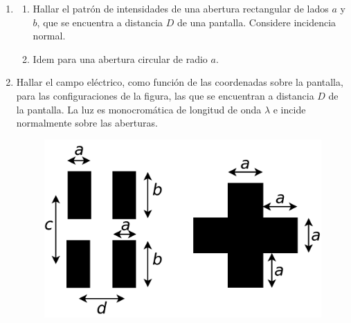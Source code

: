\documentclass[11pt,spanish,a4paper]{article}
\begin{document}
\begin{enumerate}
\item 
\begin{enumerate}
\item Hallar el patrón de intensidades de una abertura rectangular de lados
$a$ y $b$, que se encuentra a distancia $D$ de una pantalla. Considere
incidencia normal. 
\item Idem para una abertura circular de radio $a$.
\end{enumerate}
\item Hallar el campo eléctrico, como función de las coordenadas sobre la
pantalla, para las configuraciones de la figura, las que se encuentran
a distancia $D$ de la pantalla. La luz es monocromática de longitud
de onda $\lambda$ e incide normalmente sobre las aberturas. 
\begin{figure}[H]
\centering{}\includegraphics[clip,scale=0.25]{ej5-35}
\end{figure}




\end{enumerate}
\end{document}
